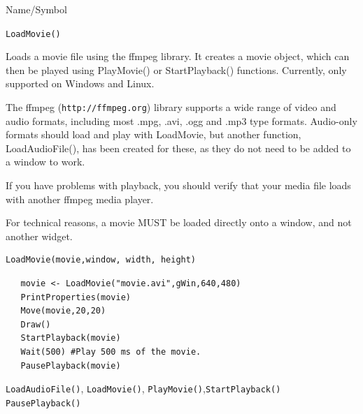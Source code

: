 \begin{desc}{Name/Symbol}
\item[Name/Symbol]	\verb+LoadMovie()+
 
\item[Description] Loads a movie file using the ffmpeg library.  It creates a movie
object, which can then be played using PlayMovie() or StartPlayback() functions.  Currently,
only supported on Windows and Linux.

The ffmpeg (\verb+http://ffmpeg.org+) library supports a wide range of video and audio formats,
including most .mpg, .avi, .ogg and .mp3 type formats.  Audio-only formats should load
and play with LoadMovie, but another function, LoadAudioFile(), has been created for these,
as they do not need to be added to a window to work.

If you have problems with playback, 
you should verify that your media file loads with another ffmpeg media player.

For technical reasons, a movie MUST be loaded directly onto a window, and not another widget.

\item[Usage]		
\begin{verbatim}
LoadMovie(movie,window, width, height)
\end{verbatim}

\item[Example]	
\begin{verbatim}
   movie <- LoadMovie("movie.avi",gWin,640,480)
   PrintProperties(movie)
   Move(movie,20,20)
   Draw() 
   StartPlayback(movie)
   Wait(500) #Play 500 ms of the movie.
   PausePlayback(movie)
\end{verbatim}

\item[See Also] \verb+LoadAudioFile()+, \verb+LoadMovie()+, \verb+PlayMovie()+,\verb+StartPlayback()+ \verb+PausePlayback()+
\end{desc}

